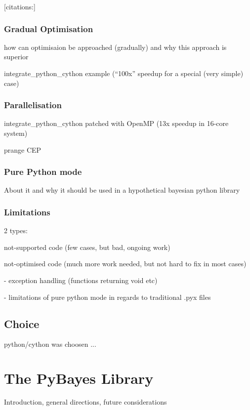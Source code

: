 \documentclass[a4paper,12pt,oneside]{report}
\begin{document}
[citations:\cite{BehBraSel:09,Sel:09,BehBraCitDalSelSmi:11}]

\subsection{Gradual Optimisation}

how can optimisaion be approached (gradually) and why this approach is superior

integrate\_python\_cython example (``100x'' speedup for a special (very simple) case)

\subsection{Parallelisation}

integrate\_python\_cython patched with OpenMP (13x speedup in 16-core system)

prange CEP

\subsection{Pure Python mode}

About it and why it should be used in a hypothetical bayesian python library

\subsection{Limitations}

2 types:

	not-supported code (few cases, but bad, ongoing work)

	not-optimised code (much more work needed, but not hard to fix in most cases)

		- exception handling (functions returning void etc)

		- limitations of pure python mode in regards to traditional .pyx files

\section{Choice}

python/cython was choosen ...


\chapter{The PyBayes Library}

Introduction, general directions, future considerations
\end{document}
